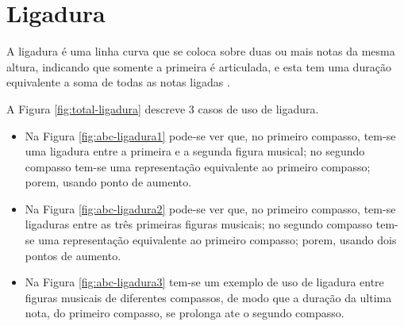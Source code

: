 
\section{Ligadura}
\label{sec:ligadura}

A ligadura é uma linha curva que se coloca sobre duas ou mais notas da mesma altura, 
indicando que somente a primeira é articulada, 
e esta tem uma duração equivalente a soma de todas as notas ligadas \cite[pp. 35]{cardoso1973curso}.

\begin{example}
A Figura \ref{fig:total-ligadura} descreve 3 casos de uso de ligadura.
\begin{itemize}
\item Na Figura \ref{fig:abc-ligadura1} pode-se ver que, no primeiro compasso, 
tem-se uma ligadura entre a primeira e a segunda figura musical; 
no segundo compasso tem-se uma representação equivalente ao primeiro compasso; 
porem, usando ponto de aumento.
\item Na Figura \ref{fig:abc-ligadura2} pode-se ver que, no primeiro compasso, 
tem-se ligaduras entre as três primeiras figuras musicais; 
no segundo compasso tem-se uma representação equivalente ao primeiro compasso; 
porem, usando dois pontos de aumento.
\item Na Figura \ref{fig:abc-ligadura3} tem-se um exemplo de uso de ligadura entre figuras musicais de diferentes compassos,
de modo que a duração da ultima nota, do primeiro compasso, se prolonga ate o segundo compasso.
\end{itemize}
\end{example}


